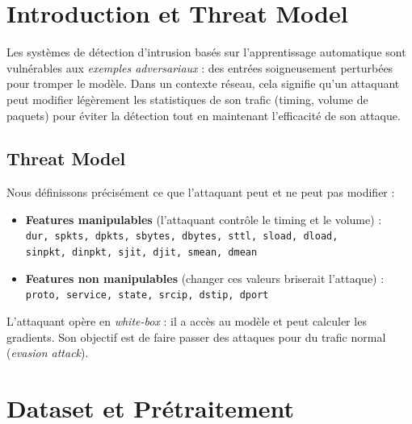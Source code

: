 \documentclass[11pt,a4paper]{article}
\begin{document}
\tableofcontents
\vspace{0.5em}

\section{Introduction et Threat Model}

Les syst\`emes de d\'etection d'intrusion bas\'es sur l'apprentissage automatique sont vuln\'erables aux
\emph{exemples adversariaux} : des entr\'ees soigneusement perturb\'ees pour tromper le mod\`ele.
Dans un contexte r\'eseau, cela signifie qu'un attaquant peut modifier l\'eg\`erement les statistiques
de son trafic (timing, volume de paquets) pour \'eviter la d\'etection tout en maintenant l'efficacit\'e
de son attaque.

\subsection*{Threat Model}

Nous d\'efinissons pr\'ecis\'ement ce que l'attaquant peut et ne peut pas modifier :

\begin{itemize}[leftmargin=1.5em]
    \item \textbf{Features manipulables} (l'attaquant contr\^ole le timing et le volume) :\\
    \texttt{dur, spkts, dpkts, sbytes, dbytes, sttl, sload, dload,}\\
    \texttt{sinpkt, dinpkt, sjit, djit, smean, dmean}
    \item \textbf{Features non manipulables} (changer ces valeurs briserait l'attaque) :\\
    \texttt{proto, service, state, srcip, dstip, dport}
\end{itemize}

L'attaquant op\`ere en \emph{white-box} : il a acc\`es au mod\`ele et peut calculer les gradients.
Son objectif est de faire passer des attaques pour du trafic normal (\emph{evasion attack}).

\section{Dataset et Pr\'etraitement}
\end{document}
